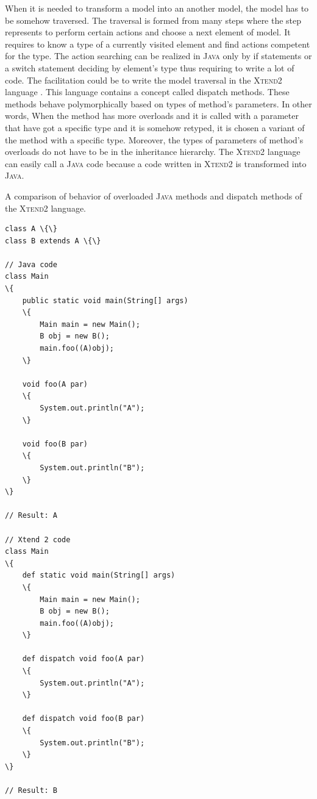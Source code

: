 \documentclass[12pt,notitlepage,a4paper]{report}
\begin{document}
When it is needed to transform a model into an another model, the model has to be somehow traversed. The traversal is formed from many steps where the step represents to perform certain actions and choose a next element of model. It requires to know a type of a currently visited element and find actions competent for the type.  The action searching can be realized in \textsc{Java} only by if statements or a switch statement deciding by element's type thus requiring to write a lot of code. The facilitation could be to write the model traversal in the \textsc{Xtend2} language \cite{Xtend}.  This language contains a concept called dispatch methods. These methods behave polymorphically based on types of method's parameters. In other words, When the method has more overloads and it is called with a parameter that have got a specific type and it is somehow retyped, it is chosen a variant of the method with a specific type. Moreover, the types of parameters of method's overloads do not have to be in the inheritance hierarchy. The \textsc{Xtend2} language can easily call a \textsc{Java} code because a code written in  \textsc{Xtend2} is transformed into \textsc{Java}.

\begin{expl}\label{HeuristicNonterms}
A comparison of behavior of overloaded \textsc{Java} methods  and  dispatch methods of the \textsc{Xtend2}  language.
\begingroup
\fontsize{10pt}{12pt}
\begin{Verbatim}[commandchars=\\\{\}]
class A \{\}
class B extends A \{\}

// Java code
class Main
\{
    public static void main(String[] args)
    \{
        Main main = new Main();
        B obj = new B();
        main.foo((A)obj);
    \}
	
    void foo(A par)
    \{
        System.out.println("A");
    \}
	
    void foo(B par)
    \{
        System.out.println("B");
    \}
\}

// Result: A

// Xtend 2 code
class Main
\{
    def static void main(String[] args)
    \{
        Main main = new Main();
        B obj = new B();
        main.foo((A)obj);
    \}
	
    def dispatch void foo(A par)
    \{
        System.out.println("A");
    \}
	
    def dispatch void foo(B par)
    \{
        System.out.println("B");
    \}
\}

// Result: B
\end{Verbatim}
\endgroup
\end{expl}
\end{document}
